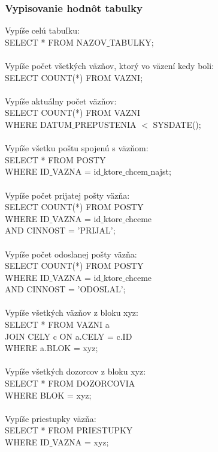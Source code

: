 \documentclass[slovak, 12pt, Times New Roman]{article}
\begin{document}
			\subsubsection{Vypisovanie hodnôt tabulky}
				Vypíše celú tabuľku:\\
				SELECT * FROM NAZOV$\_$TABULKY;\\ \\
				Vypíše počet všetkých väzňov, ktorý vo väzení kedy boli:\\
				SELECT COUNT(*) FROM VAZNI;\\ \\
				Vypíše aktuálny počet väzňov:\\
				SELECT COUNT(*) FROM VAZNI \\ WHERE DATUM$\_$PREPUSTENIA $<$ SYSDATE();\\ \\
				Vypíše všetku poštu spojenú s väzňom:\\
				SELECT * FROM POSTY \\ WHERE ID$\_$VAZNA = id$\_$ktore$\_$chcem$\_$najst;\\ \\
				Vypíše počet prijatej pošty väzňa:\\
				SELECT COUNT(*) FROM POSTY \\ WHERE ID$\_$VAZNA = id$\_$ktore$\_$chceme \\ AND CINNOST = 'PRIJAL';\\ \\
				Vypíše počet odoslanej pošty väzňa:\\
				SELECT COUNT(*) FROM POSTY \\ WHERE ID$\_$VAZNA = id$\_$ktore$\_$chceme \\ AND CINNOST = 'ODOSLAL';\\ \\
				Vypíše všetkých väzňov z bloku xyz:\\
				SELECT * FROM VAZNI a \\ JOIN CELY c ON a.CELY = c.ID \\ WHERE a.BLOK = xyz;\\ \\
				Vypíše všetkých dozorcov z bloku xyz:\\
				SELECT * FROM DOZORCOVIA \\ WHERE BLOK = xyz;\\ \\
				Vypíše priestupky väzňa:\\
				SELECT * FROM PRIESTUPKY \\ WHERE ID$\_$VAZNA = xyz;\\ \\
\end{document}
